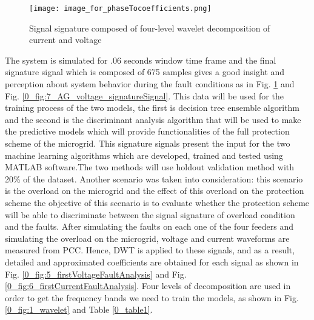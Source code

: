 \documentclass[8pt,a4paper,oneside]{elsarticle}
\begin{document}
\begin{figure}[H]
    \centering
    \texttt{[image: image\_for\_phaseTocoefficients.png]}
    \caption{Signal signature composed of four-level wavelet decomposition of current and voltage}
    \label{0_fig:2_signalsignatureComposition}
\end{figure}
The system is simulated for .06 seconds window time frame and the final signature signal which is composed of 675 samples gives a good insight and perception about system behavior during the
fault conditions as in Fig. \ref{0_fig:2_signalsignatureComposition} and Fig. \ref{0_fig:7_AG_voltage_signatureSignal}. This data will be used for the training process of the two models, the first is decision tree ensemble algorithm and the second is the discriminant analysis algorithm that will be used to make the predictive models which will provide functionalities of the full protection scheme of the microgrid. This signature signals present
the input for the two machine learning algorithms which are developed, trained and tested using MATLAB software.The two methods will use holdout validation method with 20\% of the dataset. 
Another scenario was taken into consideration: this scenario is the overload on the microgrid and the effect of this overload on the protection scheme the objective of this scenario is to evaluate whether the protection scheme will be able to discriminate between the signal signature of overload condition and the faults. 
After simulating the faults on each one of the four
feeders and simulating the overload on the microgrid, voltage and current waveforms are measured from
PCC. Hence, DWT is applied to these signals, and as a
result, detailed and approximated coefficients are obtained
for each signal as shown in Fig. \ref{0_fig:5_firstVoltageFaultAnalysis} and Fig. \ref{0_fig:6_firstCurrentFaultAnalysis}. Four levels
of decomposition are used in order to get the frequency
bands we need to train the models, as shown in Fig. \ref{0_fig:1_wavelet} and Table \ref{0_table1}.
\end{document}
